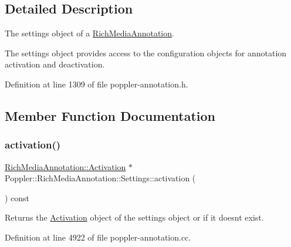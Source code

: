 \subsection{Detailed Description}
The settings object of a \hyperlink{class_poppler_1_1_rich_media_annotation}{Rich\+Media\+Annotation}.

The settings object provides access to the configuration objects for annotation activation and deactivation. 

Definition at line 1309 of file poppler-\/annotation.\+h.



\subsection{Member Function Documentation}
\mbox{\label{class_poppler_1_1_rich_media_annotation_1_1_settings_a728542a659141af0cf7a721561b20bf4}} 
\subsubsection{\texorpdfstring{activation()}{activation()}}
{\footnotesize\ttfamily \hyperlink{class_poppler_1_1_rich_media_annotation_1_1_activation}{Rich\+Media\+Annotation\+::\+Activation} $\ast$ Poppler\+::\+Rich\+Media\+Annotation\+::\+Settings\+::activation (\begin{DoxyParamCaption}{ }\end{DoxyParamCaption}) const}

Returns the \hyperlink{class_poppler_1_1_rich_media_annotation_1_1_activation}{Activation} object of the settings object or {} if it doesn\textquotesingle{}t exist. 

Definition at line 4922 of file poppler-\/annotation.\+cc.

\mbox{\label{class_poppler_1_1_rich_media_annotation_1_1_settings_ad82cea32021c702293df20ec644caf16}} 
